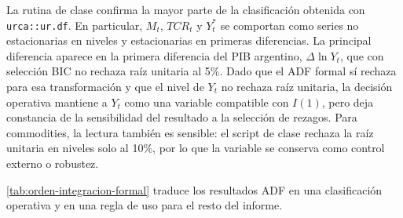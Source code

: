 \documentclass[11pt,a4paper]{article}
\begin{document}
	La rutina de clase confirma la mayor parte de la clasificación obtenida con
	\texttt{urca::ur.df}. En particular, \(M_t\), \(TCR_t\) y \(Y_t^*\) se
	comportan como series no estacionarias en niveles y estacionarias en primeras
	diferencias. La principal diferencia aparece en la primera diferencia del PIB
	argentino, \(\Delta \ln Y_t\), que con selección BIC no rechaza raíz unitaria al
	5\%. Dado que el ADF formal sí rechaza para esa transformación y que el nivel de
	\(Y_t\) no rechaza raíz unitaria, la decisión operativa mantiene a \(Y_t\) como
	una variable compatible con \(I(1)\), pero deja constancia de la sensibilidad
	del resultado a la selección de rezagos. Para commodities, la lectura también
	es sensible: el script de clase rechaza la raíz unitaria en niveles solo al
	10\%, por lo que la variable se conserva como control externo o robustez.
	
	\autoref{tab:orden-integracion-formal} traduce los resultados ADF en una
	clasificación operativa y en una regla de uso para el resto del informe.
	
	\begin{table}[H]
		\centering
		\caption{Clasificación integrada de raíces unitarias y uso econométrico.}
		\label{tab:orden-integracion-formal}
		\scriptsize
		\caption*{\footnotesize Fuente:
			.}
	\end{table}
	
\end{document}
